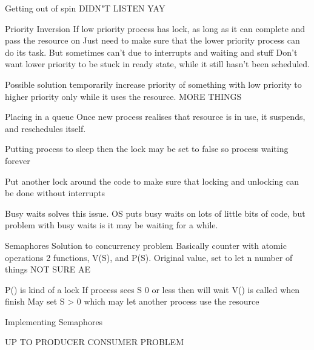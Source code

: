 \documentclass{article}
\begin{document}
	Getting out of spin
		DIDN"T LISTEN YAY

	Priority Inversion
		If low priority process has lock, as long as it can complete and pass the resource on
		Just need to make sure that the lower priority process can do its task. But sometimes can't due to interrupts and waiting and stuff
		Don't want lower priority to be stuck in ready state, while it still hasn't been scheduled.

		Possible solution
		temporarily increase priority of something with low priority to higher priority only while it uses the resource.
		MORE THINGS

	Placing in a queue
		Once new process realises that resource is in use, it suspends, and reschedules itself.

		Putting process to sleep then the lock may be set to false so process waiting forever

		Put another lock around the code to make sure that locking and unlocking can be done without interrupts

		Busy waits solves this issue. OS puts busy waits on lots of little bits of code, but problem with busy waits is it may be waiting for a while.

	Semaphores
		Solution to concurrency problem
		Basically counter with atomic operations
		2 functions, V(S), and P(S).
		Original value, set to let n number of things NOT SURE AE

		P() is kind of a lock
			If process sees S 0 or less then will wait
		V() is called when finish
			May set S > 0 which may let another process use the resource

	Implementing Semaphores

	UP TO PRODUCER CONSUMER PROBLEM




		
			











				
				

		
\end{document}
